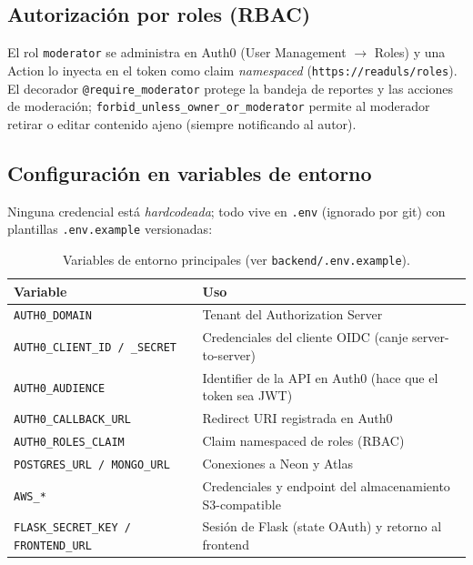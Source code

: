 \documentclass{article}
\begin{document}
\subsection{Autorización por roles (RBAC)}

El rol \texttt{moderator} se administra en Auth0 (User Management
$\rightarrow$ Roles) y una Action lo inyecta en el token como claim
\textit{namespaced} (\texttt{https://readuls/roles}). El decorador
\texttt{@require\_moderator} protege la bandeja de reportes y las acciones de
moderación; \texttt{forbid\_unless\_owner\_or\_moderator} permite al moderador
retirar o editar contenido ajeno (siempre notificando al autor).

\subsection{Configuración en variables de entorno}

Ninguna credencial está \textit{hardcodeada}; todo vive en \texttt{.env}
(ignorado por git) con plantillas \texttt{.env.example} versionadas:

\begin{table}[H]
\setlength{\tabcolsep}{0.4em}
{\renewcommand{\arraystretch}{1.25}
\footnotesize
\begin{tabular}{|p{4.6cm}|p{9.8cm}|}
    \hline
    \rowcolor{tablebackground}
    \color{white}\textbf{Variable} & \color{white}\textbf{Uso} \\
    \hline
    \texttt{AUTH0\_DOMAIN} & Tenant del Authorization Server \\
    \hline
    \texttt{AUTH0\_CLIENT\_ID / \_SECRET} & Credenciales del cliente OIDC (canje server-to-server) \\
    \hline
    \texttt{AUTH0\_AUDIENCE} & Identifier de la API en Auth0 (hace que el token sea JWT) \\
    \hline
    \texttt{AUTH0\_CALLBACK\_URL} & Redirect URI registrada en Auth0 \\
    \hline
    \texttt{AUTH0\_ROLES\_CLAIM} & Claim namespaced de roles (RBAC) \\
    \hline
    \texttt{POSTGRES\_URL / MONGO\_URL} & Conexiones a Neon y Atlas \\
    \hline
    \texttt{AWS\_*} & Credenciales y endpoint del almacenamiento S3-compatible \\
    \hline
    \texttt{FLASK\_SECRET\_KEY / FRONTEND\_URL} & Sesión de Flask (state OAuth) y retorno al frontend \\
    \hline
\end{tabular}}
\caption{Variables de entorno principales (ver \texttt{backend/.env.example}).}
\end{table}
\end{document}
